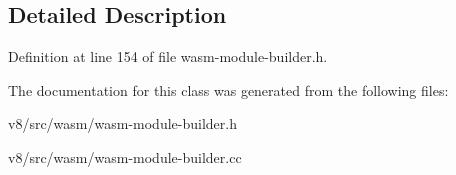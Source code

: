 \subsection{Detailed Description}


Definition at line 154 of file wasm-\/module-\/builder.\+h.



The documentation for this class was generated from the following files\+:\begin{DoxyCompactItemize}
\item 
v8/src/wasm/wasm-\/module-\/builder.\+h\item 
v8/src/wasm/wasm-\/module-\/builder.\+cc\end{DoxyCompactItemize}
